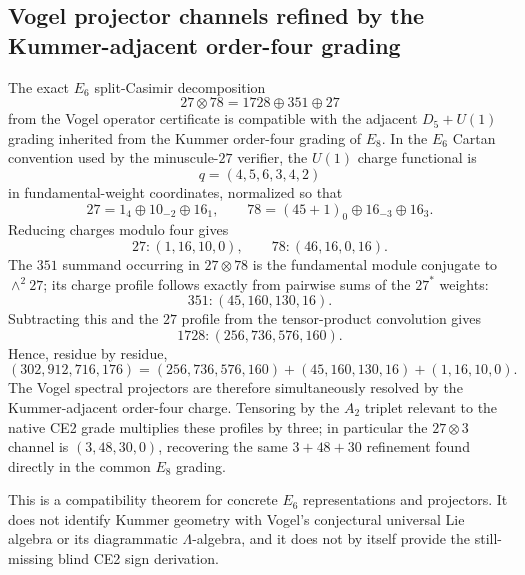 \subsection{Vogel projector channels refined by the Kummer-adjacent order-four grading}
\label{subsec:vogel-kummer-z4-refinement}

The exact $E_6$ split-Casimir decomposition
\[
 27\otimes78=1728\oplus351\oplus27
\]
from the Vogel operator certificate is compatible with the adjacent $D_5+U(1)$ grading
inherited from the Kummer order-four grading of $E_8$.  In the $E_6$ Cartan convention used
by the minuscule-$27$ verifier, the $U(1)$ charge functional is
\[
 q=(4,5,6,3,4,2)
\]
in fundamental-weight coordinates, normalized so that
\[
 27=1_4\oplus10_{-2}\oplus16_1,
 \qquad
 78=(45+1)_0\oplus16_{-3}\oplus16_3.
\]
Reducing charges modulo four gives
\[
 27:(1,16,10,0),\qquad 78:(46,16,0,16).
\]
The $351$ summand occurring in $27\otimes78$ is the fundamental module conjugate to
$\wedge^2 27$; its charge profile follows exactly from pairwise sums of the $27^*$ weights:
\[
 \boxed{351:(45,160,130,16)}.
\]
Subtracting this and the $27$ profile from the tensor-product convolution gives
\[
 \boxed{1728:(256,736,576,160)}.
\]
Hence, residue by residue,
\[
 (302,912,716,176)
 =(256,736,576,160)+(45,160,130,16)+(1,16,10,0).
\]
The Vogel spectral projectors are therefore simultaneously resolved by the
Kummer-adjacent order-four charge.  Tensoring by the $A_2$ triplet relevant to the native
CE2 grade multiplies these profiles by three; in particular the $27\otimes3$ channel is
$(3,48,30,0)$, recovering the same $3+48+30$ refinement found directly in the common
$E_8$ grading.

This is a compatibility theorem for concrete $E_6$ representations and projectors.  It
does not identify Kummer geometry with Vogel's conjectural universal Lie algebra or its
diagrammatic $\Lambda$-algebra, and it does not by itself provide the still-missing blind
CE2 sign derivation.
